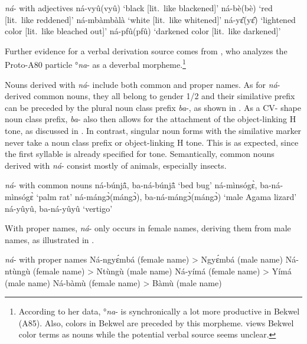 \ea \label{naSIM1} {\itshape ná}- with adjectives
\ea  ná-vyû(vyû) `black [lit.\ like blackened]'
\ex ná-bè(bè) `red [lit.\ like reddened]' 
\ex ná-mbàmbàlà `white [lit.\ like whitened]' 
\ex ná-yɛ̂(yɛ̂) `lightened color [lit.\ like bleached out]'
\ex ná-pfû(pfû) `darkened color [lit.\ like darkened]'
\z
\z

\noindent Further evidence for a verbal derivation source comes from \citet[382]{cheucle2014}, who analyzes the Proto-A80 particle °{\itshape na}- as a deverbal morpheme.\footnote{According to her data, °{\itshape na}- is synchronically a lot more productive in Bekwel (A85). Also, colors in Bekwel are preceded by this morpheme. \citet[138]{cheucle2014} views Bekwel color terms as nouns while the potential verbal source seems unclear.}

Nouns derived with {\itshape ná}- include both common and proper names. As for {\itshape ná}- derived common nouns, they all belong to gender 1/2 and their similative prefix can be preceded by the plural noun class prefix {\itshape ba}-, as shown in . As a CV- shape noun class prefix, {\itshape ba}- also then allows for the attachment of the object-linking H tone, as discussed in .  In contrast, singular noun forms with the similative marker never take a noun class prefix or  object-linking H tone. This is as expected, since the first syllable is already specified for tone.  Semantically, common nouns derived with {\itshape ná}- consist mostly of animals, especially insects.

\ea \label{naSIM2} {\itshape ná}- with common nouns
\ea ná-búnjã̂, ba-ná-búnjã̂ `bed bug'
\ex ná-mìnsógɛ̀, ba-ná-mìnsógɛ̀ `palm rat'
\ex ná-mángɔ̀(mángɔ̀), ba-ná-mángɔ̀(mángɔ̀) `male Agama lizard'
\ex ná-yûyû, ba-ná-yûyû `vertigo'
\z
\z

\noindent With proper names, {\itshape ná}- only occurs in female names, deriving them from male names, as illustrated in .

\ea \label{naSIM3}  {\itshape ná}- with proper names
\ea  Ná-ngyɛ́mbá (female name) > Ngyɛ́mbá (male name)
\ex Ná-ntùngù (female name)  > Ntùngù (male name)
\ex Ná-yímá (female name) > Yímá (male name)
\ex Ná-bàmù (female name) > Bàmù (male name)
\z
\z

